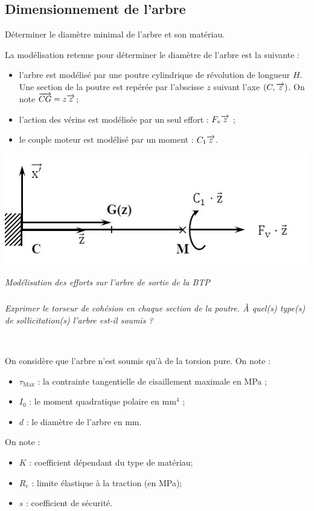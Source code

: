 \documentclass[10pt,fleqn]{article} %
\begin{document}
\begin{multicols}{2}
\subsection*{Dimensionnement de l’arbre}
\begin{obj}	Déterminer le diamètre minimal de l’arbre et son matériau.
\end{obj}

La modélisation retenue pour déterminer le diamètre de l’arbre est la suivante  :
\begin{itemize}
\item l’arbre est modélisé par une poutre cylindrique de révolution de longueur $H$. Une section de la poutre est repérée par l’abscisse $z$ suivant l’axe $(C,\overrightarrow{z})$. On note $\overrightarrow{CG}=z\overrightarrow{z}$;
\item l’action des vérins est modélisée par un seul effort : $F_v \overrightarrow{z}$ ;
\item le couple moteur est modélisé par un moment : $C_1\overrightarrow{z}$.
\end{itemize} 

\begin{center}
\includegraphics[width=\linewidth]{images/fig_05}

\textit{Modélisation des efforts sur l’arbre de sortie de la BTP}
\end{center}

\subparagraph{}\textit{Exprimer le torseur de cohésion en chaque section de la poutre.  À quel(s) type(s) de sollicitation(s) l’arbre est-il soumis ?}
\ifprof
\begin{corrige}~\\
\end{corrige}
\else
\fi

On considère que l’arbre n’est soumis qu’à de la torsion pure.
On note :
\begin{itemize}
\item $\tau_{\text{Max}}$ : la contrainte tangentielle de cisaillement maximale en MPa ;
\item $I_0$ : le moment quadratique polaire en $\text{mm}^4$ ;
\item $d$ : le diamètre de l’arbre en mm.
\end{itemize}
On note :
\begin{itemize}
\item $K$ : coefficient dépendant du type de matériau;
\item $R_e$ : limite élastique à la traction (en MPa);
\item $s$ : coefficient de sécurité.
\end{itemize}


\end{multicols}
\end{document}
